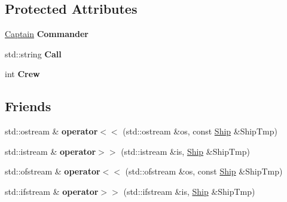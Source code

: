 \subsection*{Protected Attributes}
\begin{DoxyCompactItemize}
\item 
\mbox{\label{class_aircraft_carrier_group_1_1_ship_a551f55d472f8d013f302236bfc1ee60c}} 
\mbox{\hyperlink{struct_aircraft_carrier_group_1_1_captain}{Captain}} {\bfseries Commander}
\item 
\mbox{\label{class_aircraft_carrier_group_1_1_ship_ae5e952ab78478211991ebd55280b4d83}} 
std\+::string {\bfseries Call}
\item 
\mbox{\label{class_aircraft_carrier_group_1_1_ship_ad22fd8a68b68dfd4650db4c289d8d2e2}} 
int {\bfseries Crew}
\end{DoxyCompactItemize}
\subsection*{Friends}
\begin{DoxyCompactItemize}
\item 
\mbox{\label{class_aircraft_carrier_group_1_1_ship_a52737ad29fba46242149b8ee7f8bc564}} 
std\+::ostream \& {\bfseries operator$<$$<$} (std\+::ostream \&os, const \mbox{\hyperlink{class_aircraft_carrier_group_1_1_ship}{Ship}} \&Ship\+Tmp)
\item 
\mbox{\label{class_aircraft_carrier_group_1_1_ship_ad17876454eb6dc21c99bd3d1324bf233}} 
std\+::istream \& {\bfseries operator$>$$>$} (std\+::istream \&is, \mbox{\hyperlink{class_aircraft_carrier_group_1_1_ship}{Ship}} \&Ship\+Tmp)
\item 
\mbox{\label{class_aircraft_carrier_group_1_1_ship_a8fb66d532d2af20b0638bd3d4f66fbef}} 
std\+::ofstream \& {\bfseries operator$<$$<$} (std\+::ofstream \&os, const \mbox{\hyperlink{class_aircraft_carrier_group_1_1_ship}{Ship}} \&Ship\+Tmp)
\item 
\mbox{\label{class_aircraft_carrier_group_1_1_ship_a1e8e383cfd4c5342f07dceb6f5018a69}} 
std\+::ifstream \& {\bfseries operator$>$$>$} (std\+::ifstream \&is, \mbox{\hyperlink{class_aircraft_carrier_group_1_1_ship}{Ship}} \&Ship\+Tmp)
\end{DoxyCompactItemize}


